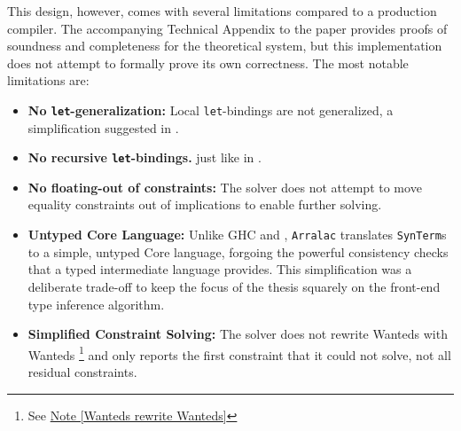 This design, however, comes with several limitations compared to a production compiler. The accompanying Technical Appendix to the paper \cite{practical-type-inference-proofs} provides proofs of soundness and completeness for the theoretical system, but this implementation does not attempt to formally prove its own correctness. The most notable limitations are:
\begin{itemize}
    \item \textbf{No \texttt{let}-generalization:} Local \texttt{let}-bindings are not generalized, a simplification suggested in \cite{vytiniotis-outsideinx-2011}.
    \item \textbf{No recursive \texttt{let}-bindings.} just like in \cite{jones-practical-2007}.
    \item \textbf{No floating-out of constraints:} The solver does not attempt to move equality constraints out of implications to enable further solving.
    \item \textbf{Untyped Core Language:} Unlike GHC and \cite{jones-practical-2007}, \texttt{Arralac} translates \texttt{SynTerm}s to a simple, untyped Core language, forgoing the powerful consistency checks that a typed intermediate language provides. This simplification was a deliberate trade-off to keep the focus of the thesis squarely on the front-end type inference algorithm.
    \item \textbf{Simplified Constraint Solving:} The solver does not rewrite Wanteds with Wanteds \footnote{See \href{https://github.com/ghc/ghc/blob/ed38c09bd89307a7d3f219e1965a0d9743d0ca73/compiler/GHC/Tc/Types/Constraint.hs\#L2415}{Note [Wanteds rewrite Wanteds]}} and only reports the first constraint that it could not solve, not all residual constraints.
\end{itemize}